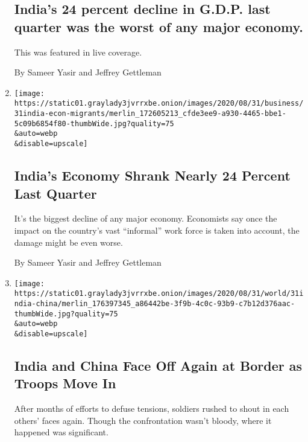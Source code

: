 \begin{enumerate}
  \hypertarget{indias-24-percent-decline-in-gdp-last-quarter-was-the-worst-of-any-major-economy}{%
  \subsection{India's 24 percent decline in G.D.P. last quarter was the
  worst of any major
  economy.}\label{indias-24-percent-decline-in-gdp-last-quarter-was-the-worst-of-any-major-economy}}

  This was featured in live coverage.

  By Sameer Yasir and Jeffrey Gettleman
\item
  \href{/2020/08/31/world/asia/india-economy-gdp.html}{}

  \texttt{[image: https://static01.graylady3jvrrxbe.onion/images/2020/08/31/business/31india-econ-migrants/merlin\_172605213\_cfde3ee9-a930-4465-bbe1-5c09b6854f80-thumbWide.jpg?quality=75\\\&auto=webp\\\&disable=upscale]}

  \hypertarget{indias-economy-shrank-nearly-24-percent-last-quarter}{%
  \subsection{India's Economy Shrank Nearly 24 Percent Last
  Quarter}\label{indias-economy-shrank-nearly-24-percent-last-quarter}}

  It's the biggest decline of any major economy. Economists say once the
  impact on the country's vast ``informal'' work force is taken into
  account, the damage might be even worse.

  By Sameer Yasir and Jeffrey Gettleman
\item
  \href{/2020/08/31/world/asia/india-china-troops-border.html}{}

  \texttt{[image: https://static01.graylady3jvrrxbe.onion/images/2020/08/31/world/31india-china/merlin\_176397345\_a86442be-3f9b-4c0c-93b9-c7b12d376aac-thumbWide.jpg?quality=75\\\&auto=webp\\\&disable=upscale]}

  \hypertarget{india-and-china-face-off-again-at-border-as-troops-move-in}{%
  \subsection{India and China Face Off Again at Border as Troops Move
  In}\label{india-and-china-face-off-again-at-border-as-troops-move-in}}

  After months of efforts to defuse tensions, soldiers rushed to shout
  in each others' faces again. Though the confrontation wasn't bloody,
  where it happened was significant.


\end{enumerate}
